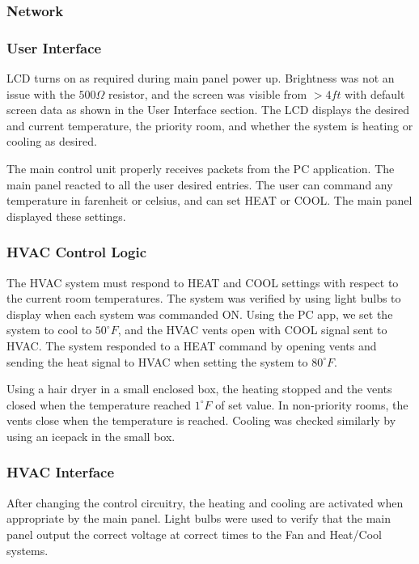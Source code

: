 \subsubsection{Network}

\subsubsection{User Interface}
LCD turns on as required during main panel power up.  Brightness was not an issue with the $500\Omega$ resistor, and the screen was visible from $>4ft$ with default screen data as shown in the User Interface section.  The LCD displays the desired and current temperature, the priority room, and whether the system is heating or cooling as desired.

The main control unit properly receives packets from the PC application.  The main panel reacted to all the user desired entries.  The user can command any temperature in farenheit or celsius, and can set HEAT or COOL.  The main panel displayed these settings.

\subsubsection{HVAC Control Logic}
The HVAC system must respond to HEAT and COOL settings with respect to the current room temperatures.  The system was verified by using light bulbs to display when each system was commanded ON.  Using the PC app, we set the system to cool to $50^\circ F$, and the HVAC vents open with COOL signal sent to HVAC.  The system responded to a HEAT command by opening vents and sending the heat signal to HVAC when setting the system to $80^\circ F$.

Using a hair dryer in a small enclosed box, the heating stopped and the vents closed when the temperature reached $1^\circ F$ of set value.  In non-priority rooms, the vents close when the temperature is reached.  Cooling was checked similarly by using an icepack in the small box.

\subsubsection{HVAC Interface}
After changing the control circuitry, the heating and cooling are activated when appropriate by the main panel.  Light bulbs were used to verify that the main panel output the correct voltage at correct times to the Fan and Heat/Cool systems.


